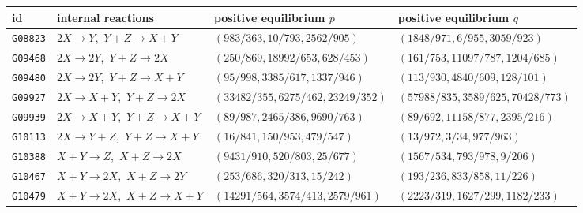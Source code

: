 \begin{tabular}{llll}\toprule
id & internal reactions & positive equilibrium $p$ & positive equilibrium $q$\\\midrule
\texttt{G08823} & $2X\to Y$,\ $Y+Z\to X+Y$ & $(983/363,10/793,2562/905)$ & $(1848/971,6/955,3059/923)$\\
\texttt{G09468} & $2X\to 2Y$,\ $Y+Z\to 2X$ & $(250/869,18992/653,628/453)$ & $(161/753,11097/787,1204/685)$\\
\texttt{G09480} & $2X\to 2Y$,\ $Y+Z\to X+Y$ & $(95/998,3385/617,1337/946)$ & $(113/930,4840/609,128/101)$\\
\texttt{G09927} & $2X\to X+Y$,\ $Y+Z\to 2X$ & $(33482/355,6275/462,23249/352)$ & $(57988/835,3589/625,70428/773)$\\
\texttt{G09939} & $2X\to X+Y$,\ $Y+Z\to X+Y$ & $(89/987,2465/386,9690/763)$ & $(89/692,11158/877,2395/216)$\\
\texttt{G10113} & $2X\to Y+Z$,\ $Y+Z\to X+Y$ & $(16/841,150/953,479/547)$ & $(13/972,3/34,977/963)$\\
\texttt{G10388} & $X+Y\to Z$,\ $X+Z\to 2X$ & $(9431/910,520/803,25/677)$ & $(1567/534,793/978,9/206)$\\
\texttt{G10467} & $X+Y\to 2X$,\ $X+Z\to 2Y$ & $(253/686,320/313,15/242)$ & $(193/236,833/858,11/226)$\\
\texttt{G10479} & $X+Y\to 2X$,\ $X+Z\to X+Y$ & $(14291/564,3574/413,2579/961)$ & $(2223/319,1627/299,1182/233)$\\
\bottomrule\end{tabular}
